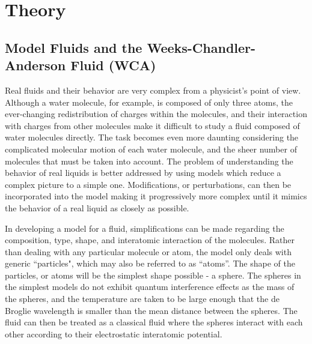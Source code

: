 \documentclass[double,12pt]{beavtex}
\begin{document}
\chapter{Theory}

\section{Model Fluids and the Weeks-Chandler-Anderson Fluid (WCA)}

Real fluids and their behavior are very complex from a physicist's point 
of view. Although a water molecule, for example, is composed of only three
atoms, the ever-changing redistribution of charges within the molecules, 
and their interaction with charges from other molecules make it difficult 
to study a fluid composed of water molecules directly. The task becomes 
even more daunting considering the complicated molecular motion of each 
water molecule, and the sheer number of molecules that must be taken 
into account. 
The problem of understanding the behavior of real liquids is better addressed 
by using models which reduce a complex picture to a simple one. Modifications, 
or perturbations, can then be incorporated into the model making it 
progressively more complex until it mimics the behavior of a real 
liquid as closely as possible.

In developing a model for a fluid, simplifications can be made regarding 
the composition, type, shape, and interatomic interaction of the molecules. 
Rather than dealing with any particular molecule or atom, the model only 
deals with generic ``particles", which may also be referred to as ``atoms''. 
The shape of the particles, or atoms will be the simplest shape possible - 
a sphere. The spheres in the simplest models do not exhibit quantum 
interference effects as the mass of the spheres, and the temperature 
are taken to be large enough that the de Broglie wavelength is smaller 
than the mean distance between the spheres. The fluid can then be treated 
as a classical fluid where the spheres interact with each other according 
to their electrostatic interatomic potential. 
\end{document}

